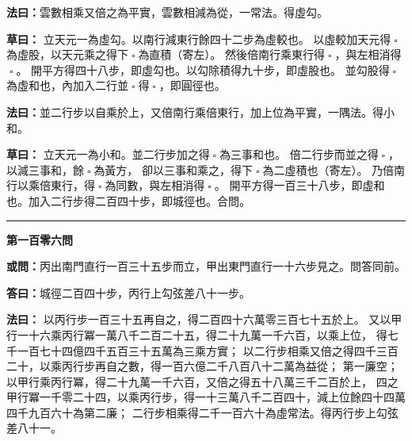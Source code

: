 \documentclass[11pt,a4paper]{article}
\let\origsquare\square
\renewcommand{\square}{\ensuremath{\origsquare}}%
\newcommand{\longline}{\noindent\rule{\textwidth}{0.4pt}}
\newcommand{\owen}[1]{%
  \par\vspace{0.4em}%
  \noindent\textcolor{problemcolor}{\textbf{或問：}}{\tradfont #1}\par\nopagebreak%
}
\newcommand{\fayue}[1]{%
  \par\noindent\textcolor{methodcolor}{\textbf{法曰：}}{\tradfont #1}\par\nopagebreak%
}
\newcommand{\tsaoyue}[1]{%
  \par\noindent\textcolor{workcolor}{\textbf{草曰：}}{\tradfont #1}\par%
}
\newcommand{\dayue}[1]{%
  \par\noindent\textcolor{anscolor}{\textbf{答曰：}}{\tradfont #1}\par\nopagebreak%
}
\newcommand{\wen}[1]{\par\vspace{0.3em}\noindent\textcolor{problemcolor}{\textbf{第#1問}}\par}
\begin{document}
\fayue{雲數相乘又倍之為平實，雲數相減為從，一常法。得虛勾。}

\tsaoyue{%
立天元一為虛勾。以南行減東行餘四十二步為虛較也。
以虛較加天元得$ \; \square \; $為虛股，以天元乘之得下$ \; \square \; $為直積（寄左）。
然後倍南行乘東行得$ \; \square \; $，與左相消得$ \; \square \; $。
開平方得四十八步，即虛勾也。以勾除積得九十步，即虛股也。
並勾股得$ \; \square \; $為虛和也，內加入二行並$ \; \square \; $得$ \; \square \; $，即圓徑也。}

\fayue{並二行步以自乘於上，又倍南行乘倍東行，加上位為平實，一隅法。得小和。}

\tsaoyue{%
立天元一為小和。並二行步加之得$ \; \square \; $為三事和也。
倍二行步而並之得$ \; \square \; $，以減三事和，餘$ \; \square \; $為黃方，
卻以三事和乘之，得下$ \; \square \; $為二虛積也（寄左）。
乃倍南行以乘倍東行，得$ \; \square \; $為同數，與左相消得$ \; \square \; $。
開平方得一百三十八步，即虛和也。加入二行步得二百四十步，即城徑也。合問。}

\vspace{0.5cm}
\begin{center}
\longline
\end{center}

\wen{一百零六}
\owen{丙出南門直行一百三十五步而立，甲出東門直行一十六步見之。問答同前。}
\dayue{城徑二百四十步，丙行上勾弦差八十一步。}

\fayue{%
以丙行步一百三十五再自之，得二百四十六萬零三百七十五於上。
又以甲行一十六乘丙行冪一萬八千二百二十五，得二十九萬一千六百，以乘上位，
得七千一百七十四億四千五百三十五萬為三乘方實；
以二行步相乘又倍之得四千三百二十，以乘丙行步再自之數，得一百六億二千八百八十二萬為益從；
第一廉空；以甲行乘丙行冪，得二十九萬一千六百，又倍之得五十八萬三千二百於上，
四之甲行冪一千零二十四，以乘丙行步，得一十三萬八千二百四十，減上位餘四十四萬四千九百六十為第二廉；
二行步相乘得二千一百六十為虛常法。得丙行步上勾弦差八十一。}
\end{document}
